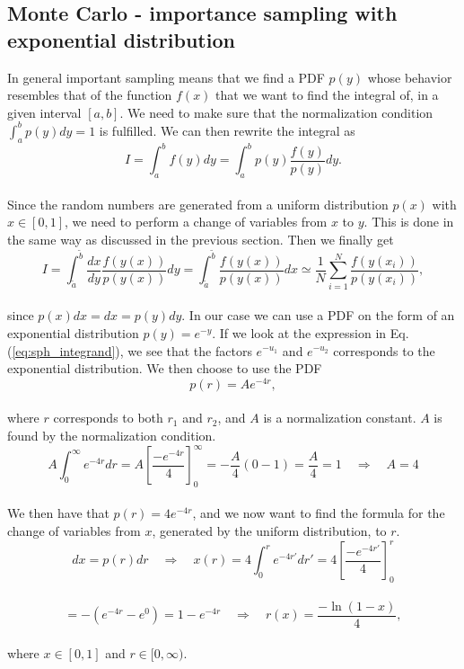 \documentclass[12pt]{article}
\begin{document}
\begin{flushleft}
\subsection{Monte Carlo - importance sampling with exponential distribution}
In general important sampling means that we find a PDF $p(y)$ whose behavior resembles that of the function $f(x)$ that we want to find the integral of, in a given interval $[a,b]$. We need to make sure that the normalization condition $\int_a^b p(y)dy = 1$ is fulfilled. We can then rewrite the integral as\\
\vspace{5mm}
$$I = \int_a^b f(y)dy = \int_a^b p(y)\frac{f(y)}{p(y)}dy.$$\\
\newpage
Since the random numbers are generated from a uniform distribution $p(x)$ with $x\in [0,1]$, we need to perform a change of variables from $x$ to $y$. This is done in the same way as discussed in the previous section. Then we finally get\\
\vspace{5mm}
$$I =\int_{\tilde{a}}^{\tilde{b}} \frac{dx}{dy}\frac{f(y(x))}{p(y(x))}dy = \int_{\tilde{a}}^{\tilde{b}} \frac{f(y(x))}{p(y(x))}dx\simeq \frac{1}{N}\sum\limits_{i=1}^N \frac{f(y(x_i))}{p(y(x_i))},$$\\
\vspace{5mm} 
since $p(x)dx = dx = p(y)dy$. In our case we can use a PDF on the form of an exponential distribution $p(y) = e^{-y}$. If we look at the expression in Eq. (\ref{eq:sph_integrand}), we see that the factors $e^{-u_1}$ and $e^{-u_2}$ corresponds to the exponential distribution. We then choose to use the PDF\\
\vspace{5mm}
$$p(r) = Ae^{-4r},$$\\
\vspace{5mm}
where $r$ corresponds to both $r_1$ and $r_2$, and $A$ is a normalization constant. $A$ is found by the normalization condition.
\vspace{5mm}
$$A\int_0^\infty e^{-4r} dr= A\left[\frac{-e^{-4r}}{4}\right]_0^\infty = -\frac{A}{4}\left(0 - 1\right) = \frac{A}{4} = 1\quad\Rightarrow\quad A = 4$$\\
\vspace{5mm}
We then have that $p(r) = 4e^{-4r}$, and we now want to find the formula for the change of variables from $x$, generated by the uniform distribution, to $r$.
\vspace{5mm}
$$dx = p(r)dr \quad\Rightarrow\quad x(r) = 4\int_0^r e^{-4r'} dr' = 4\left[\frac{-e^{-4r'}}{4}\right]_0^r$$\\
\vspace{5mm}
$$= -(e^{-4r}-e^0) = 1-e^{-4r}\quad\Rightarrow\quad r(x) = \frac{-\ln(1-x)}{4},$$\\
\vspace{5mm}
where $x\in [0,1]$ and $r\in[0,\infty)$.
\newpage

\end{flushleft}
\end{document}

